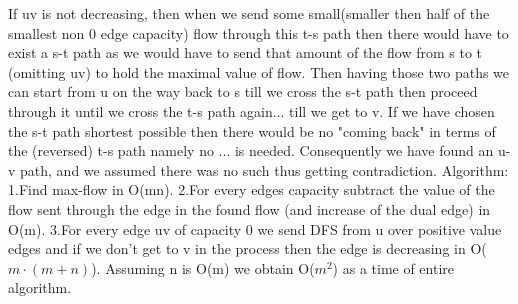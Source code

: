 \documentclass{article}
\begin{document}
If uv is not decreasing, then when we send some small(smaller then half of the smallest non 0 edge capacity) flow through this t-s path
then there would have to exist a s-t path as we would have to send that amount of the flow from s to t (omitting uv) to hold the maximal value of flow.\newline
Then having those two paths we can start from u on the way back to s till we cross the s-t path then proceed through it until we cross the t-s path again... till we get to v.
If we have chosen the s-t path shortest possible then there would be no "coming back" in terms of the (reversed) t-s path namely no ... is needed. Consequently we have found an u-v path,
and we assumed there was no such thus getting contradiction.\newline
Algorithm:\newline
1.Find max-flow in O(mn).\newline
2.For every edges capacity subtract the value of the flow sent through the edge in the found flow (and increase of the dual edge) in O(m).\newline
3.For every edge uv of capacity 0 we send DFS from u over positive value edges and if we don't get to v in the process then the edge is decreasing in O($m\cdot(m+n)$).\newline
Assuming n is O(m) we obtain O($m^2$) as a time of entire algorithm.
\end{document}
